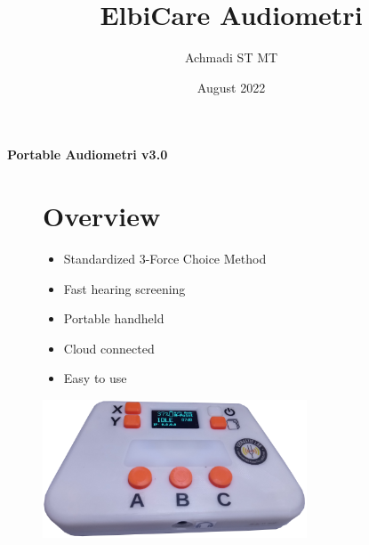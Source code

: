 \documentclass[a4paper,12pt,oneside,pdflatex,italian,final,twocolumn]{article}
\title{ElbiCare Audiometri}
\author{Achmadi ST MT}
\date{August 2022}
\begin{document}
\pagestyle{fancy}

\chead {\today}


\onecolumn

\begin{figure}

\end{figure}\begin{minipage}{0.47\textwidth}
\centering

\end{minipage}
\hfill
\begin{minipage}{0.47\textwidth}
\raggedleft
\Huge \textbf{Portable Audiometri v3.0}
\end{minipage}


\begin{figure}
\begin{minipage}{0.47\textwidth}

\section{Overview}
    \begin{itemize}
        \item Standardized 3-Force Choice Method
        \item Fast hearing screening
        \item Portable handheld
        \item Cloud connected
        \item Easy to use
    \end{itemize}


\end{minipage}
\hfill
\begin{minipage}{0.47\textwidth}
\centering
\includegraphics[width=0.7\textwidth,right]{images/audiometri.png}

\end{minipage}
\end{figure}
\end{document}

